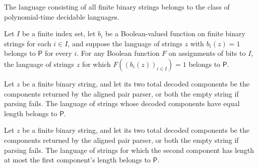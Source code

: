 \begin{theorem}
\label{Complexity.univ_mem_P}
\leanok
{}
The language consisting of all finite binary strings belongs to the class of
polynomial-time decidable languages.
\end{theorem}

\begin{theorem}
\label{Complexity.mem_P_of_atoms}
\leanok
{}
Let $I$ be a finite index set, let $b_i$ be a Boolean-valued function on finite binary
strings for each $i\in I$, and suppose the language of strings $z$ with $b_i(z)=1$
belongs to $\mathsf{P}$ for every $i$. For any Boolean function $F$ on assignments of
bits to $I$, the language of strings $z$ for which $F((b_i(z))_{i\in I})=1$ belongs to
$\mathsf{P}$.
\end{theorem}

\begin{theorem}
\label{Complexity.lenEq_mem_P}
\leanok
{}
Let $z$ be a finite binary string, and let its two total decoded components be the
components returned by the aligned pair parser, or both the empty string if parsing
fails. The language of strings whose decoded components have equal length belongs to
$\mathsf{P}$.
\end{theorem}

\begin{theorem}
\label{Complexity.lenLe_mem_P}
\leanok
{}
Let $z$ be a finite binary string, and let its two total decoded components be the
components returned by the aligned pair parser, or both the empty string if parsing
fails. The language of strings for which the second component has length at most the
first component's length belongs to $\mathsf{P}$.
\end{theorem}

